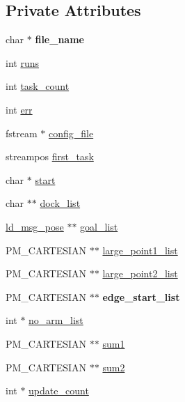 \subsection*{Private Attributes}
\begin{DoxyCompactItemize}
\item 
\mbox{\label{classcart__config_a3de41943f6230959d80159eb591cc9ef}} 
char $\ast$ {\bfseries file\+\_\+name}
\item 
int \mbox{\hyperlink{classcart__config_a7ad70584604bd971e639efb74a1552ec}{runs}}
\item 
int \mbox{\hyperlink{classcart__config_a54560028df17adebca7d034b3b246f45}{task\+\_\+count}}
\item 
int \mbox{\hyperlink{classcart__config_a5b331a578d28d3abec6625ac8952fe37}{err}}
\item 
fstream $\ast$ \mbox{\hyperlink{classcart__config_a471d3cd9fe8d8722e43194c55a45e976}{config\+\_\+file}}
\item 
streampos \mbox{\hyperlink{classcart__config_af683646edbe7260d8b12bc4fe4f885db}{first\+\_\+task}}
\item 
char $\ast$ \mbox{\hyperlink{classcart__config_a353c41c44acad0ec6620f92d01942e7f}{start}}
\item 
char $\ast$$\ast$ \mbox{\hyperlink{classcart__config_a3b73d8e5b48ba87502d77028ec765023}{dock\+\_\+list}}
\item 
\mbox{\hyperlink{structld__msg__pose}{ld\+\_\+msg\+\_\+pose}} $\ast$$\ast$ \mbox{\hyperlink{classcart__config_ac484fbaf3da5c3fcbf6b0b338ebf7812}{goal\+\_\+list}}
\item 
P\+M\+\_\+\+C\+A\+R\+T\+E\+S\+I\+AN $\ast$$\ast$ \mbox{\hyperlink{classcart__config_ae86eebedcace9bd7afabc6f264051ceb}{large\+\_\+point1\+\_\+list}}
\item 
P\+M\+\_\+\+C\+A\+R\+T\+E\+S\+I\+AN $\ast$$\ast$ \mbox{\hyperlink{classcart__config_a8f71e861e41c9f8fee2c05f2bad2d31e}{large\+\_\+point2\+\_\+list}}
\item 
\mbox{\label{classcart__config_ad48da65aaea1760122f798fb19d44453}} 
P\+M\+\_\+\+C\+A\+R\+T\+E\+S\+I\+AN $\ast$$\ast$ {\bfseries edge\+\_\+start\+\_\+list}
\item 
int $\ast$ \mbox{\hyperlink{classcart__config_a79325b64754bf4e6135d77234c85e2d8}{no\+\_\+arm\+\_\+list}}
\item 
P\+M\+\_\+\+C\+A\+R\+T\+E\+S\+I\+AN $\ast$$\ast$ \mbox{\hyperlink{classcart__config_a4bafa2b778c01f3648df8f24b24e59bb}{sum1}}
\item 
P\+M\+\_\+\+C\+A\+R\+T\+E\+S\+I\+AN $\ast$$\ast$ \mbox{\hyperlink{classcart__config_aa45f914752bd0cdfa4d7473be5d15a78}{sum2}}
\item 
int $\ast$ \mbox{\hyperlink{classcart__config_a68c64182da792f9eb4475705a228aae0}{update\+\_\+count}}
\end{DoxyCompactItemize}


